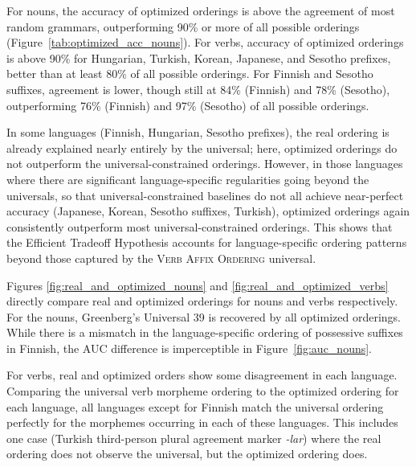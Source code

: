 \documentclass[man]{apa7}
\begin{document}
For nouns, the accuracy of optimized orderings is above the agreement of most random grammars, outperforming 90\% or more of all possible orderings (Figure~\ref{tab:optimized_acc_nouns}).
For verbs, accuracy of optimized orderings is above 90\% for Hungarian, Turkish, Korean, Japanese, and Sesotho prefixes, better than at least 80\% of all possible orderings. 
For Finnish and Sesotho suffixes, agreement is lower, though still at 84\% (Finnish) and 78\% (Sesotho), outperforming 76\% (Finnish) and 97\% (Sesotho) of all possible orderings.


In some languages (Finnish, Hungarian, Sesotho prefixes), the real ordering is already explained nearly entirely by the universal; here, optimized orderings do not outperform the universal-constrained orderings.
However, in those languages where  there are significant language-specific regularities going beyond the universals, so that universal-constrained baselines do not all achieve near-perfect accuracy (Japanese, Korean, Sesotho suffixes, Turkish), optimized orderings again consistently outperform most universal-constrained orderings.
This shows that the Efficient Tradeoff Hypothesis accounts for language-specific ordering patterns beyond those captured by the \textsc{Verb Affix Ordering} universal.


Figures \ref{fig:real_and_optimized_nouns} and \ref{fig:real_and_optimized_verbs} directly compare real and optimized orderings for nouns and verbs respectively.
For the nouns, Greenberg's Universal 39 is recovered by all optimized orderings.
While there is a mismatch in the language-specific ordering of possessive suffixes in Finnish, the AUC difference is imperceptible in Figure~\ref{fig:auc_nouns}.

For verbs, real and optimized orders show some disagreement in each language.
Comparing the universal verb morpheme ordering to the optimized ordering for each language, all languages except for Finnish match the universal ordering perfectly for the morphemes occurring in each of these languages.
This includes one case (Turkish third-person plural agreement marker \textit{-lar}) where the real ordering does not observe the universal, but the optimized ordering does.
\end{document}
